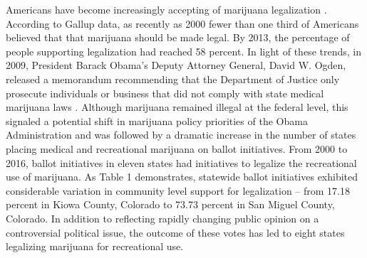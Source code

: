 Americans have become increasingly accepting of marijuana legalization \citep{caulkins_et_al_2012,rosenthal_and_kubby_1996,gallup_2013,pew_2013}. According to Gallup data, as recently as 2000 fewer than one third of Americans believed that that marijuana should be made legal. By 2013, the percentage of people supporting legalization had reached 58 percent. In light of these trends, in 2009, President Barack Obama's Deputy Attorney General, David W. Ogden, released a memorandum recommending that the Department of Justice only prosecute individuals or business that did not comply with state medical marijuana laws \citep{ogden_2009}. Although marijuana remained illegal at the federal level, this signaled a potential shift in marijuana policy priorities of the Obama Administration and was followed by a dramatic increase in the number of states placing medical and recreational marijuana on ballot initiatives. From 2000 to 2016, ballot initiatives in eleven states had initiatives to legalize the recreational use of marijuana. As Table 1 demonstrates, statewide ballot initiatives exhibited considerable variation in community level support for legalization -- from 17.18 percent in Kiowa County, Colorado to 73.73 percent in San Miguel County, Colorado. In addition to reflecting rapidly changing public opinion on a controversial political issue, the outcome of these votes has led to eight states legalizing marijuana for recreational use. 






